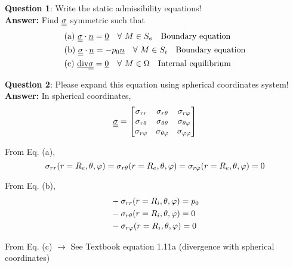 
\noindent \textbf{Question 1}: Write the static admissibility equations! \\

\textbf{Answer:} Find $\underline{\underline{\sigma}} $ symmetric such that 
\begin{equation}
\begin{split}
& \text{(a)  } \underline{\underline{\sigma}} \cdot \underline{n} = \underline{0} \quad \forall \text{ } M \in S_e \quad \text{Boundary equation} \\
& \text{(b)  } \underline{\underline{\sigma}} \cdot \underline{n} = - p_0 \underline{n} \quad \forall \text{ } M \in S_i \quad \text{Boundary equation} \\
& \text{(c)  } \text{\underline{div}} \underline{\underline{\sigma}} = \underline{0} \quad \forall \text{ } M \in \Omega \quad \text{Internal equilibrium}
\end{split}
\end{equation}

\noindent \textbf{Question 2}: Please expand this equation using spherical  coordinates system! \\

\textbf{Answer:} In spherical coordinates,
\begin{equation}
\underline{\underline{\sigma}} = \left[
\begin{matrix}
\sigma_{rr} & \sigma_{r\theta} & \sigma_{r\varphi} \\
\sigma_{r\theta} & \sigma_{\theta\theta} & \sigma_{\theta \varphi} \\
\sigma_{r\varphi} & \sigma_{\theta \varphi} & \sigma_{\varphi\varphi} 
\end{matrix}
\right]
\end{equation}

From Eq. (a),
\begin{equation}
\sigma_{rr}(r = R_e,\theta,\varphi) = \sigma_{r\theta} (r=R_e,\theta,\varphi) = \sigma_{r\varphi}(r=R_e,\theta,\varphi) = 0
\end{equation}

From Eq. (b),
\begin{equation}
\begin{split}
& -\sigma_{rr}(r=R_i,\theta,\varphi) = p_0 \\
& -\sigma_{r\theta}(r=R_i,\theta,\varphi) = 0 \\
& -\sigma_{r\varphi}(r=R_i,\theta,\varphi) = 0
\end{split}
\end{equation}

From Eq. (c) $\rightarrow$ See Textbook equation 1.11a (divergence with spherical coordinates) \\



